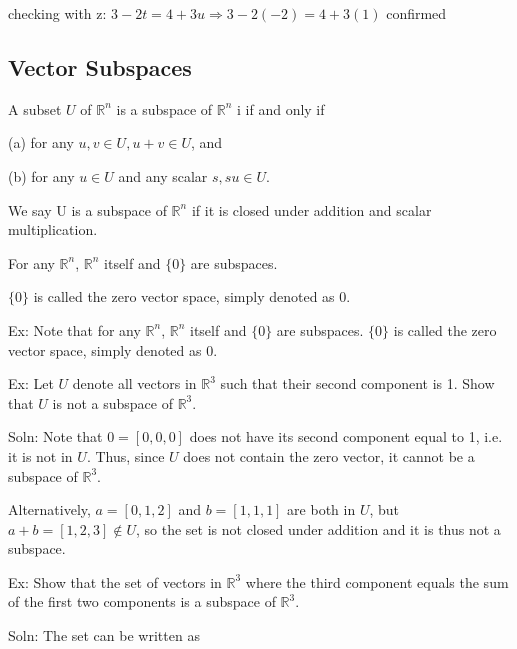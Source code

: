 \documentclass{extarticle}
\begin{document}
checking with z: $3-2t =4+3u \Rightarrow 3-2(-2)=4+3(1)$ confirmed 



\subsection{Vector Subspaces}
A subset $U$ of ${\mathbb{R}}^n$ is a subspace of ${\mathbb{R}}^n$ i if and only if

(a) for any $u, v \in U, u + v \in U$, and

(b) for any $u \in U$ and any scalar $s, su \in U$.

We say U is a subspace of ${\mathbb{R}}^n $ if it is closed under addition and scalar multiplication.

\smallskip
\smallskip



For any ${\mathbb{R}}^n $, ${\mathbb{R}}^n $ itself and $\{0\}$ are subspaces.

$\{0\}$ is called the zero vector space, simply denoted as 0.



Ex: Note that for any ${\mathbb{R}}^n $, ${\mathbb{R}}^n $ itself and $\{0\}$ are subspaces. $\{0\}$ is called the zero vector space, simply denoted as 0.

\begin{tcolorbox}[enhanced jigsaw,sharp corners,coltext=black,colback=BurntOrange!25!white,boxrule=0pt,breakable,size=minimal]



Ex: Let $U$ denote all vectors in ${\mathbb{R}}^3 $ such that their second component is 1. Show that $U$ is not a subspace of ${\mathbb{R}}^3 $.

Soln: Note that $0 = [0, 0, 0]$ does not have its second component equal to 1, i.e. it is not in $U$. Thus, since $U$ does not contain the zero vector, it cannot be a subspace of ${\mathbb{R}}^3 $.

Alternatively, $a = [0, 1, 2]$ and $b = [1, 1, 1]$ are both in $U$, but $a+b = [1, 2, 3] \notin U$, so the set is not closed under addition and it is thus not a subspace.


\end{tcolorbox}


Ex: Show that the set of vectors in ${\mathbb{R}}^3 $ where the third component equals the sum of the first two components is a subspace of ${\mathbb{R}}^3 $.

Soln: The set can be written as
\end{document}
